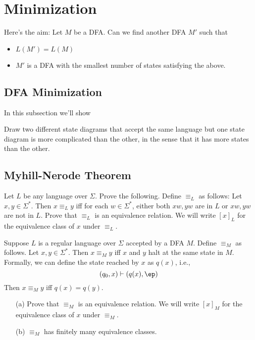 \section{Minimization} \label{S:minimization}

Here's the aim: Let $M$ be a DFA. Can we find another DFA $M'$ such
that
\begin{itemize}
 \item $L(M') = L(M)$
 \item $M'$ is a DFA with the smallest number of states satisfying
 the above.
\end{itemize}

\subsection{DFA Minimization}

In this subsection we'll show

\begin{ex}
 Draw two different state diagrams that accept the same
 language but one state diagram is more complicated than the
 other, in the sense that it has more states than the other.
\end{ex}


\subsection{Myhill-Nerode Theorem}


\begin{ex}
 Let $L$ be any language over $\Sigma$. Prove the following.
 Define $\equiv_L$ as follows: Let $x,y \in \Sigma^*$.
 Then $x \equiv_L y$ iff for each $w \in \Sigma^*$, either both
 $xw,yw$ are in $L$ or $xw,yw$ are not in $L$. Prove that
 $\equiv_L$ is an equivalence relation. We will write $[x]_L$ for
 the equivalence class of $x$ under $\equiv_L$.
\end{ex}

\begin{ex}
 Suppose $L$ is a regular language over $\Sigma$ accepted by a DFA
 $M$. Define $\equiv_M$ as follows. Let $x,y \in \Sigma^*$. Then
 $x \equiv_M y$ iff $x$ and $y$ halt at the same state in $M$.
 Formally, we can define the state reached by $x$ as $q(x)$, i.e.,
 \[ (q_0,x) \vdash (q(x),\ep) \]
 Then $x \equiv_M y$ iff $q(x) = q(y)$.
 \begin{itemize}
  \item[\textup{(a)}] Prove that $\equiv_M$ is an equivalence
  relation. We will write $[x]_M$ for the equivalence class of $x$
  under $\equiv_M$.
  \item[\textup{(b)}] $\equiv_M$ has finitely many equivalence classes.
 \end{itemize}
\end{ex}

